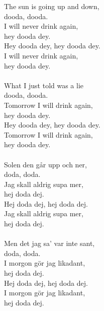 
            The sun is going up and down, \\
            dooda, dooda. \\
            I will never drink again, \\
            hey dooda dey. \\
            Hey dooda dey, hey dooda dey. \\
            I will never drink again, \\
            hey dooda dey. \\
\hspace{10mm} \\
            What I just told was a lie \\
            dooda, dooda. \\
            Tomorrow I will drink again, \\
            hey dooda dey. \\
            Hey dooda dey, hey dooda dey. \\
            Tomorrow I will drink again, \\
            hey dooda dey. \\
\hspace{10mm} \\
            Solen den går upp och ner, \\
            doda, doda. \\
            Jag skall aldrig supa mer, \\
            hej doda dej. \\
            Hej doda dej, hej doda dej. \\
            Jag skall aldrig supa mer, \\
            hej doda dej. \\
\hspace{10mm} \\
            Men det jag sa' var inte sant, \\
            doda, doda. \\
            I morgon gör jag likadant, \\
            hej doda dej. \\
            Hej doda dej, hej doda dej. \\
            I morgon gör jag likadant, \\
            hej doda dej. \\

